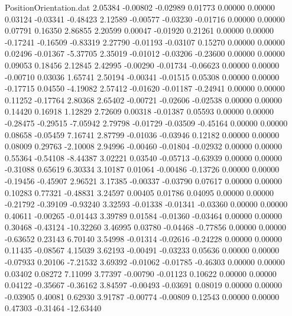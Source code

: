 \begin{filecontents}{PositionOrientation.dat}
   2.05384   -0.00802   -0.02989     0.01773    0.00000    0.00000    0.03124   -0.03341   -0.48423
   2.12589   -0.00577   -0.03230    -0.01716    0.00000    0.00000    0.07791    0.16350    2.86855
   2.20599    0.00047   -0.01920     0.21261    0.00000    0.00000   -0.17241   -0.16509   -0.83319
   2.27790   -0.01193   -0.03107     0.15270    0.00000    0.00000    0.02496   -0.01367   -5.37705
   2.35019   -0.01012   -0.03206    -0.23600    0.00000    0.00000    0.09053    0.18456    2.12845
   2.42995   -0.00290   -0.01734    -0.06623    0.00000    0.00000   -0.00710    0.03036    1.65741
   2.50194   -0.00341   -0.01515     0.05308    0.00000    0.00000   -0.17715    0.04550   -4.19082
   2.57412   -0.01620   -0.01187    -0.24941    0.00000    0.00000    0.11252   -0.17764    2.80368
   2.65402   -0.00721   -0.02606    -0.02538    0.00000    0.00000    0.14420    0.16918    1.12829
   2.72609    0.00318   -0.01387     0.05593    0.00000    0.00000   -0.28475   -0.29515   -7.05942
   2.79798   -0.01729   -0.03509    -0.45164    0.00000    0.00000    0.08658   -0.05459    7.16741
   2.87799   -0.01036   -0.03946     0.12182    0.00000    0.00000    0.08009    0.29763   -2.10008
   2.94996   -0.00460   -0.01804    -0.02932    0.00000    0.00000    0.55364   -0.54108   -8.44387
   3.02221    0.03540   -0.05713    -0.63939    0.00000    0.00000   -0.31088    0.65619    6.30334
   3.10187    0.01064   -0.00486    -0.13726    0.00000    0.00000   -0.19456   -0.45907    2.96521
   3.17385   -0.00337   -0.03790     0.07617    0.00000    0.00000    0.10283    0.77321   -0.48831
   3.24597    0.00405    0.01786     0.04095    0.00000    0.00000   -0.21792   -0.39109   -0.93240
   3.32593   -0.01338   -0.01341    -0.03360    0.00000    0.00000    0.40611   -0.00265   -0.01443
   3.39789    0.01584   -0.01360    -0.03464    0.00000    0.00000    0.30468   -0.43124  -10.32260
   3.46995    0.03780   -0.04468    -0.77856    0.00000    0.00000   -0.63652    0.23143    6.70140
   3.54998   -0.01314   -0.02616    -0.24228    0.00000    0.00000    0.11435   -0.08567    4.15039
   3.62193   -0.00491   -0.03233     0.05636    0.00000    0.00000   -0.07933    0.20106   -7.21532
   3.69392   -0.01062   -0.01785    -0.46303    0.00000    0.00000    0.03402    0.08272    7.11099
   3.77397   -0.00790   -0.01123     0.10622    0.00000    0.00000    0.04122   -0.35667   -0.36162
   3.84597   -0.00493   -0.03691     0.08019    0.00000    0.00000   -0.03905    0.40081    0.62930
   3.91787   -0.00774   -0.00809     0.12543    0.00000    0.00000    0.47303   -0.31464  -12.63440

\end{filecontents}
